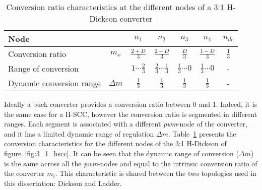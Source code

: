%
%


\begin{table}[h]

\centering
\caption{Conversion ratio characteristics at the different nodes of a 3:1 H-Dickson converter}
\label{tab:3:1 H-Dick_M}
\renewcommand{\arraystretch}{1.5}%
\begin{tabular}{l  c | c c c c c }
 Node &  & $n_1$ & $n_2$ & $n_3$ & $n_4$ & $n_{dc}$ \\
 \midrule
 Conversion ratio & $m_x$ & $\frac{2+D}{3} $    & $\frac{2-D}{3} $ & $\frac{D}{3} $ & $\frac{1-D}{3} $ & $\frac{1}{3}$ \\
 Range of conversion &       & $1 \cdots \frac{2}{3}$ & $\frac{2}{3} \cdots \frac{1}{3} $ & $\frac{1}{3} \cdots 0$ & $\frac{1}{3} \cdots 0 $ & - \\
 Dynamic conversion range & $\Delta m$ &  $\frac{1}{3}$ &  $\frac{1}{3}$ &  $\frac{1}{3}$ &  $\frac{1}{3}$ &  -
\end{tabular}
\end{table}

Ideally a buck converter provides a conversion ratio between 0 and 1. Indeed, it is the same case for a H-SCC, however the conversion ratio is segmented in different ranges. Each segment is associated with a different \emph{pwm}-node of the converter, and it has a limited dynamic range of regulation $\Delta m$. Table~\ref{tab:3:1 H-Dick_M} presents the conversion characteristics for the different nodes of the 3:1 H-Dickson of figure~\ref{fig:3_1_hscc}. It can be seen that the dynamic range of conversion ($\Delta m$) is the same across all the \emph{pwm}-nodes and equal to the intrinsic conversion ratio of the converter $m_i$. This characteristic is shared between the two topologies used in this dissertation: Dickson and Ladder.

